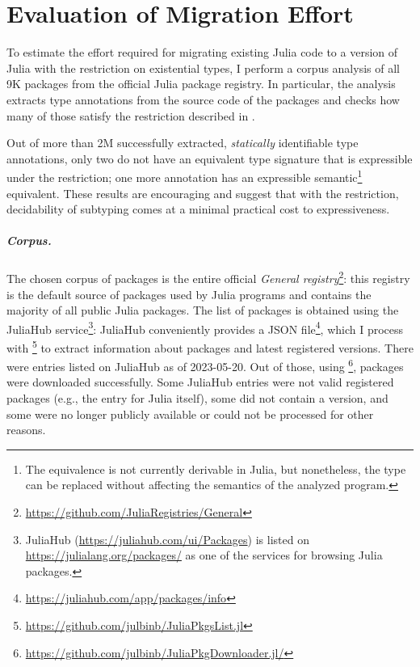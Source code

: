 \chapter{Evaluation of Migration Effort}\label{chap:eval}

To estimate the effort required for migrating existing Julia code
to a version of Julia with the restriction on existential types,
I perform a corpus analysis of all 9K packages
from the official Julia package registry.
In particular, the analysis extracts type annotations
from the source code of the packages
and checks how many of those satisfy the restriction
described in .

Out of more than 2M successfully extracted, \emph{statically} identifiable
type annotations, only two do not have an equivalent type signature
that is expressible under the restriction;
one more annotation has an expressible semantic\footnote{
  The equivalence is not currently derivable in Julia, but nonetheless,
  the type can be replaced without affecting the semantics of
  the analyzed program.} equivalent.
These results are encouraging and suggest that %
with the restriction, decidability of subtyping comes at a minimal practical
cost to expressiveness.

\paragraph{Corpus.}
The chosen corpus of packages is the entire official \emph{General
registry}\footnote{\url{https://github.com/JuliaRegistries/General}}:
this registry is the default source of packages used by Julia programs
and contains the majority of all public Julia packages.
The list of packages is obtained using
the JuliaHub service\footnote{
  JuliaHub (\url{https://juliahub.com/ui/Packages}) is listed on
  \url{https://julialang.org/packages/}
  as one of the services for browsing Julia packages.
}:
JuliaHub conveniently provides a JSON file\footnote{
  \url{https://juliahub.com/app/packages/info}
}, which I process with \footnote{
  \url{https://github.com/julbinb/JuliaPkgsList.jl}
} to extract information about packages and latest registered versions.
There were  entries listed on JuliaHub as of 2023-05-20.
Out of those, using \footnote{
  \url{https://github.com/julbinb/JuliaPkgDownloader.jl/}
},  packages were downloaded successfully.
Some JuliaHub entries were not valid registered packages
(e.g., the entry for Julia itself), some did not contain a version,
and some were no longer publicly available or could not be processed
for other reasons.

